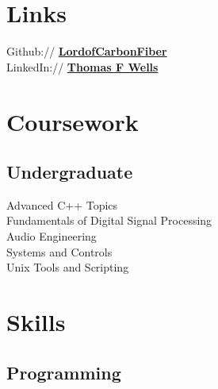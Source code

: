 \documentclass[letterpaper]{deedy-resume-openfont} %
\begin{document}
\begin{minipage}[t]{0.33\textwidth}

\section{Links} 

Github:// \href{https://github.com/lordofcarbonfiber}{\bf LordofCarbonFiber } \\
LinkedIn:// \href{https://www.linkedin.com/in/thomasfwells}{\bf Thomas F Wells} \\



\section{Coursework}

\subsection{Undergraduate}

Advanced C++ Topics \\
Fundamentals of Digital Signal Processing \\
Audio Engineering \\
 Systems and Controls\\
Unix Tools and Scripting

\sectionspace %


\section{Skills}

\subsection{Programming}


\end{minipage}
\end{document}
